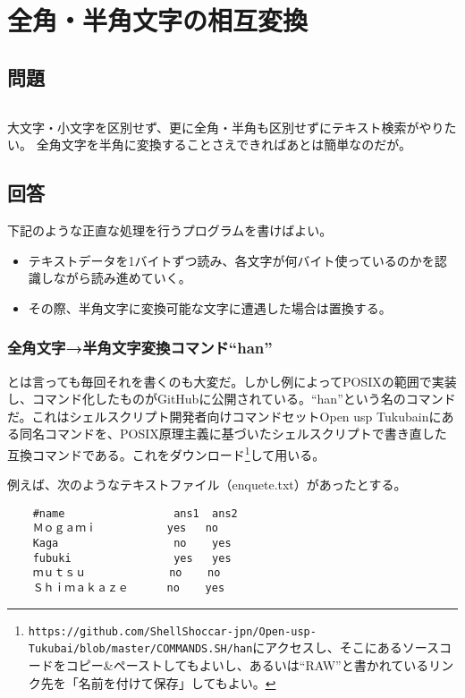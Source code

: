 \section{全角・半角文字の相互変換}
\label{recipe:han_zen}

\subsection*{問題}
\noindent
$\!\!\!\!\!$
\begin{grshfboxit}{160.0mm}
	大文字・小文字を区別せず、更に全角・半角も区別せずにテキスト検索がやりたい。
	全角文字を半角に変換することさえできればあとは簡単なのだが。
\end{grshfboxit}

\subsection*{回答}
下記のような正直な処理を行うプログラムを書けばよい。
\begin{itemize}
  \item テキストデータを1バイトずつ読み、各文字が何バイト使っているのかを認識しながら読み進めていく。
  \item その際、半角文字に変換可能な文字に遭遇した場合は置換する。
\end{itemize}

\subsubsection*{全角文字→半角文字変換コマンド``han''}

とは言っても毎回それを書くのも大変だ。しかし例によってPOSIXの範囲で実装し、コマンド化したものがGitHubに公開されている。``han''という名のコマンドだ。これはシェルスクリプト開発者向けコマンドセットOpen usp Tukubainにある同名コマンドを、POSIX原理主義に基づいたシェルスクリプトで書き直した互換コマンドである。これをダウンロード\footnote{\verb|https://github.com/ShellShoccar-jpn/Open-usp-Tukubai/blob/master/COMMANDS.SH/han|にアクセスし、そこにあるソースコードをコピー\&{}ペーストしてもよいし、あるいは``RAW''と書かれているリンク先を「名前を付けて保存」してもよい。}して用いる。

例えば、次のようなテキストファイル（enquete.txt）があったとする。\\
\begin{frameboxit}{160.0mm}
\begin{verbatim}
	#name                 ans1  ans2
	Ｍｏｇａｍｉ           yes   no
	Kaga                  no    yes
	fubuki                yes   yes
	ｍｕｔｓｕ             no    no
	Ｓｈｉｍａｋａｚｅ      no    yes
\end{verbatim}
\end{frameboxit}

